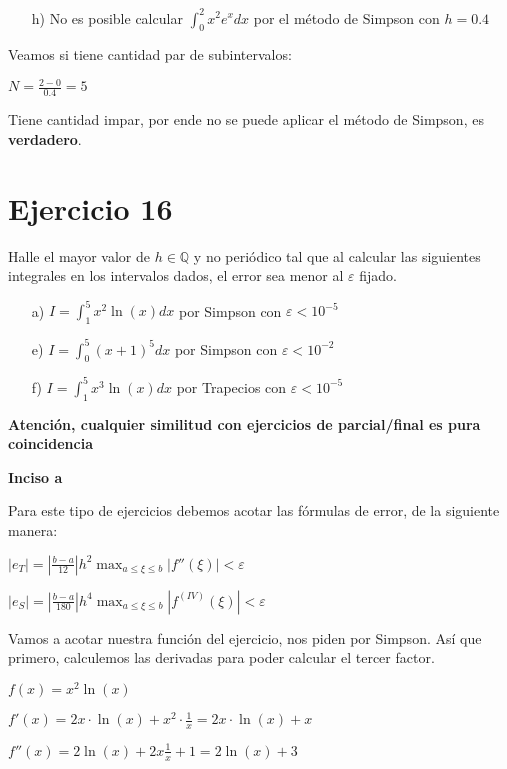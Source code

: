\documentclass[11pt]{article}
\begin{document}
	\begin{itemize}
		\item[h)] No es posible calcular $\displaystyle \int_{0}^{2} x^2e^xdx$ por el método de Simpson con $h=0.4$ 
	\end{itemize}

	Veamos si tiene cantidad par de subintervalos:
	
	$\displaystyle N=\frac{2-0}{0.4}=5$
	
	Tiene cantidad impar, por ende no se puede aplicar el método de Simpson, es \textbf{verdadero}.

	\section{Ejercicio 16}
	Halle el mayor valor de $h \in \mathbb{Q}$ y no periódico tal que al calcular las siguientes integrales en los intervalos dados, el error sea menor al $\varepsilon$ fijado.
	
	\begin{enumerate}
		\item[a)] $\displaystyle I=\int_{1}^{5}x^2\ln(x)dx$ por Simpson con $\varepsilon <10^{-5}$
		\item[e)] $\displaystyle I=\int_{0}^{5}(x+1)^5dx$ por Simpson con $\varepsilon < 10^{-2}$
		\item[f)] $\displaystyle I=\int_{1}^{5}x^3 \ln(x)dx$ por Trapecios con $\varepsilon<10^{-5}$
	\end{enumerate}

	\textbf{Atención, cualquier similitud con ejercicios de parcial/final es pura coincidencia}
	
	\textbf{Inciso a}
	
	Para este tipo de ejercicios debemos acotar las fórmulas de error, de la siguiente manera:
	
	$\displaystyle |e_T|=\left| \frac{b-a}{12} \right|h^2 \max_{a\le \xi \le b} \left|f''(\xi) \right|<\varepsilon$
	
	$\displaystyle |e_S|=\left| \frac{b-a}{180} \right|h^4 \max_{a\le \xi \le b}  \left|f^{(IV)}(\xi) \right|<\varepsilon$
	
	Vamos a acotar nuestra función del ejercicio, nos piden por Simpson. Así que primero, calculemos las derivadas para poder calcular el tercer factor.
	
	$\displaystyle f(x)=x^2\ln(x)$
	
	$\displaystyle f'(x)=2x\cdot \ln(x)+x^2\cdot \frac{1}{x}=2x\cdot \ln(x)+x$
	
	$\displaystyle f''(x)=2\ln(x)+2x\frac{1}{x}+1=2\ln(x)+3$
	
\end{document}
